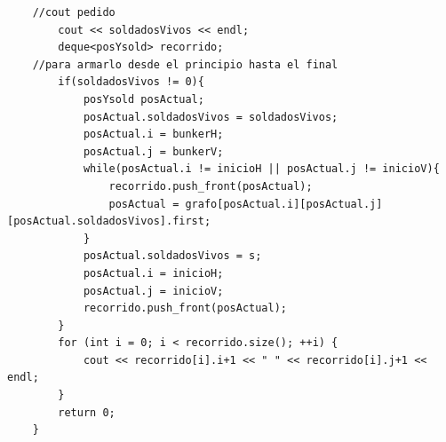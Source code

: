	\begin{codesnippet}
	\begin{verbatim}
    //cout pedido
        cout << soldadosVivos << endl;
        deque<posYsold> recorrido;
    //para armarlo desde el principio hasta el final
        if(soldadosVivos != 0){
            posYsold posActual;
            posActual.soldadosVivos = soldadosVivos;
            posActual.i = bunkerH;
            posActual.j = bunkerV;
            while(posActual.i != inicioH || posActual.j != inicioV){
                recorrido.push_front(posActual);
                posActual = grafo[posActual.i][posActual.j][posActual.soldadosVivos].first;
            }
            posActual.soldadosVivos = s;
            posActual.i = inicioH;
            posActual.j = inicioV;
            recorrido.push_front(posActual);
        }
        for (int i = 0; i < recorrido.size(); ++i) {
            cout << recorrido[i].i+1 << " " << recorrido[i].j+1 << endl;
        }
        return 0;
    }
	\end{verbatim}
	\end{codesnippet}

